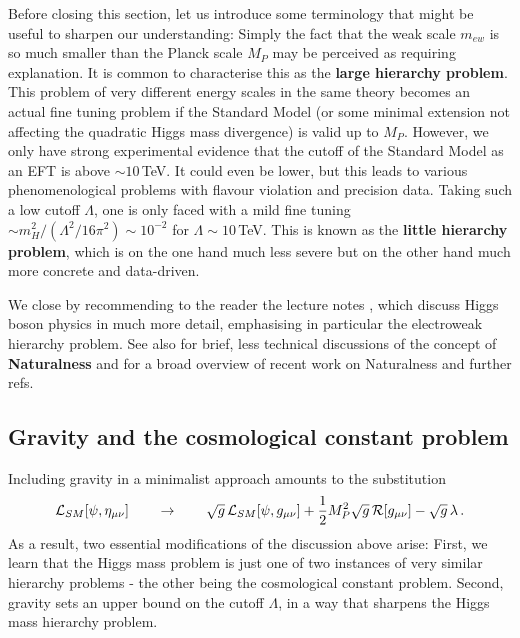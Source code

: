 \documentclass[12pt]{article}
\newcommand{\be}{\begin{equation}}
\newcommand{\ee}{\end{equation}}
\numberwithin{equation}{section}
\begin{document}
Before closing this section, let us introduce some terminology that might be useful to sharpen our understanding: Simply the fact that the weak scale $m_{ew}$ is so much smaller than the Planck scale $M_P$ may be perceived as requiring explanation. It is common to characterise this as the {\bf large hierarchy problem}. This problem of very different energy scales in the same theory becomes an actual fine tuning problem if the Standard Model (or some minimal extension not affecting the quadratic Higgs mass divergence) is valid up to $M_P$. However, we only have strong experimental evidence that the cutoff of the Standard Model as an EFT is above $\sim 10\,$TeV. It could even be lower, but this leads to various phenomenological problems with flavour violation and precision data. Taking such a low cutoff $\Lambda$, one is only faced with a mild fine tuning $\sim m_H^2/(\Lambda^2/16\pi^2) \sim 10^{-2}$ for $\Lambda\sim 10\,$TeV. This is known as the {\bf little hierarchy problem}, which is on the one hand much less severe but on the other hand much more concrete and data-driven.

We close by recommending to the reader the lecture notes \cite{Wells:2009kq}, which discuss Higgs boson physics in much more detail, emphasising in particular the electroweak hierarchy problem. See also \cite{Giudice:2013yca} for brief, less technical discussions of the concept of {\bf Naturalness} and \cite{Craig:2022uua} for a broad overview of recent work on Naturalness and further refs.





\subsection{Gravity and the cosmological constant problem}

Including gravity in a minimalist approach amounts to the substitution
\be
{\cal L}_{SM}[\psi,\eta_{\mu\nu}]\qquad\to\qquad 
\sqrt{g}\,{\cal L}_{SM}[\psi,g_{\mu\nu}]+\frac{1}{2}M_P^2\sqrt{g}\,{\cal R}[g_{\mu\nu}]-\sqrt{g}\,\lambda\,.
\ee
As a result, two essential modifications of the discussion above arise: First, we learn that the Higgs mass problem is just one of two instances of very similar hierarchy problems - the other being the cosmological constant problem. Second, gravity sets an upper bound on the cutoff $\Lambda$, in a way that sharpens the Higgs mass hierarchy problem. 
\end{document}
